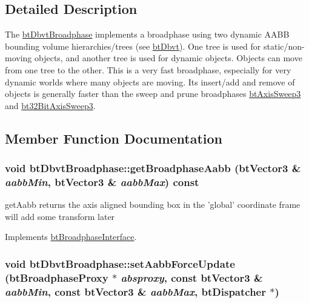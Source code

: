 \subsection{Detailed Description}
The \hyperlink{structbt_dbvt_broadphase}{btDbvtBroadphase} implements a broadphase using two dynamic AABB bounding volume hierarchies/trees (see \hyperlink{structbt_dbvt}{btDbvt}). One tree is used for static/non-moving objects, and another tree is used for dynamic objects. Objects can move from one tree to the other. This is a very fast broadphase, especially for very dynamic worlds where many objects are moving. Its insert/add and remove of objects is generally faster than the sweep and prune broadphases \hyperlink{classbt_axis_sweep3}{btAxisSweep3} and \hyperlink{classbt32_bit_axis_sweep3}{bt32BitAxisSweep3}. 

\subsection{Member Function Documentation}
\hypertarget{structbt_dbvt_broadphase_32ab55b5ef2616d0cc039cd037c05d7f}{
\subsubsection[getBroadphaseAabb]{\setlength{\rightskip}{0pt plus 5cm}void btDbvtBroadphase::getBroadphaseAabb (btVector3 \& {\em aabbMin}, \/  btVector3 \& {\em aabbMax}) const}}
\label{structbt_dbvt_broadphase_32ab55b5ef2616d0cc039cd037c05d7f}


getAabb returns the axis aligned bounding box in the 'global' coordinate frame will add some transform later 

Implements \hyperlink{classbt_broadphase_interface_b5af9e26414f5a72a76040b8fab4d9e2}{btBroadphaseInterface}.\hypertarget{structbt_dbvt_broadphase_645dd617d0bbe7767859f424e2ee18c1}{
\subsubsection[setAabbForceUpdate]{\setlength{\rightskip}{0pt plus 5cm}void btDbvtBroadphase::setAabbForceUpdate (btBroadphaseProxy $\ast$ {\em absproxy}, \/  const btVector3 \& {\em aabbMin}, \/  const btVector3 \& {\em aabbMax}, \/  {\bf btDispatcher} $\ast$)}}
\label{structbt_dbvt_broadphase_645dd617d0bbe7767859f424e2ee18c1}


